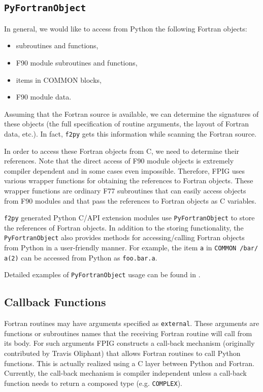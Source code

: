 \documentclass[twocolumn]{article}
\newcommand{\fpy}{\texttt{f2py}\xspace}
\begin{document}
\subsection{\texttt{PyFortranObject}}
\label{sec:PFO}

In general, we would like to access from Python the following Fortran
objects:
\begin{itemize}
\item subroutines and functions,
\item F90 module subroutines and functions,
\item items in COMMON blocks,
\item F90 module data.
\end{itemize}
Assuming that the Fortran source is available, we can determine the signatures
of these objects (the full specification of routine arguments, the
layout of Fortran data, etc.).  In fact, \fpy gets this information
while scanning the Fortran source.

In order to access these Fortran objects from C, we need to determine
their references. Note that the direct access of F90 module objects is
extremely compiler dependent and in some cases even impossible.
Therefore, FPIG uses various wrapper functions for obtaining the
references to Fortran objects. These wrapper functions are ordinary
F77 subroutines that can easily access objects from F90 modules and
that pass the references to Fortran objects as C variables.  


\fpy generated Python C/API extension modules use
\texttt{PyFortranObject} to store the references of Fortran objects.
In addition to the storing functionality, the \texttt{PyFortranObject}
also provides methods for accessing/calling Fortran objects from
Python in a user-friendly manner. For example, the item \texttt{a} in
\texttt{COMMON /bar/ a(2)} can be accessed from Python as
\texttt{foo.bar.a}.

Detailed examples of \texttt{PyFortranObject} usage can be found in 
\cite{PFO}.

\subsection{Callback Functions}
\label{sec:callback}

Fortran routines may have arguments specified as \texttt{external}.
These arguments are functions or subroutines names that the receiving Fortran routine
will call from its body. For such arguments FPIG
constructs a call-back mechanism (originally contributed by Travis
Oliphant) that allows Fortran routines to call Python functions. This
is actually realized using a C layer between Python and
Fortran. Currently, the call-back mechanism is compiler independent
unless a call-back function needs to return a composed type
(e.g. \texttt{COMPLEX}).
\end{document}

